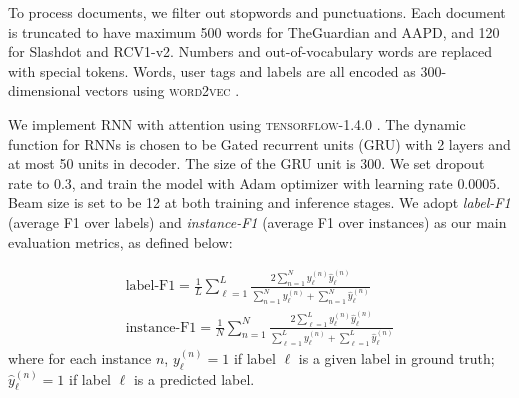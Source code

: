  To process documents, we filter out stopwords and punctuations. Each document is truncated to have maximum 500 words for TheGuardian and AAPD, and 120 for Slashdot and RCV1-v2. Numbers and out-of-vocabulary words are replaced with special tokens. Words, user tags and labels are all encoded as 300-dimensional vectors using \textsc{word2vec} \cite{DBLP:journals/corr/abs-1301-3781}.
 
 We implement  RNN with attention using \textsc{tensorflow-1.4.0} \cite{DBLP:conf/osdi/AbadiBCCDDDGIIK16}. The dynamic function for  RNNs is chosen to be Gated recurrent units (GRU) with  2 layers and at most 50 units in decoder. The  size of the GRU unit is 300. We set dropout rate to 0.3, and train the model with Adam optimizer \cite{DBLP:journals/corr/KingmaB14} with learning rate $0.0005$. Beam size is set to be 12 at both training and inference stages. We adopt \emph{label-F1} (average F1 over labels) and \emph{instance-F1} (average F1 over instances) as our main evaluation metrics, as defined below:
 
\begin{align*} \text{label-F1} = \frac{1}{L}\sum_{\ell=1}^L\frac{2\sum_{n=1}^N y^{(n)}_\ell \hat{y}^{(n)}_\ell}{\sum_{n=1}^N y^{(n)}_\ell+\sum_{n=1}^N \hat{y}^{(n)}_\ell}\\
\text{instance-F1} = \frac{1}{N}\sum_{n=1}^N\frac{2\sum_{\ell=1}^L y^{(n)}_\ell \hat{y}^{(n)}_\ell}{\sum_{\ell=1}^L y^{(n)}_\ell+\sum_{\ell=1}^L \hat{y}^{(n)}_\ell}
\end{align*}
where for each instance $n$, $y_\ell^{(n)}=1$ if label $\ell$ is a given label in ground truth; $\hat{y}_\ell^{(n)}=1$ if label $\ell$ is a predicted  label.

